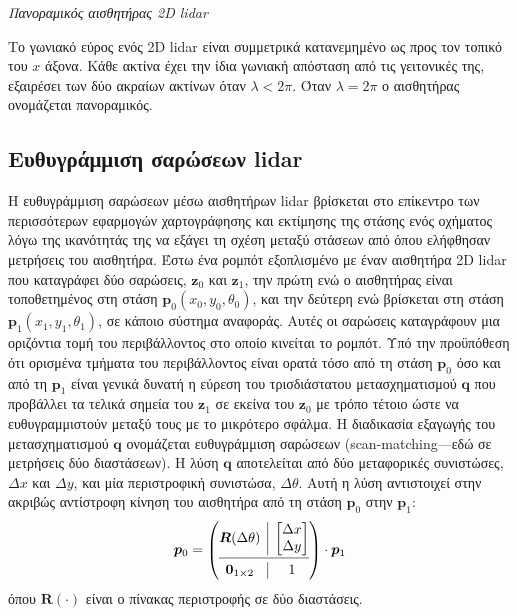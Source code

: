 \begin{bw_box}
\begin{definition}
  \label{def:panoramic_lidar_sensor}
  \textit{Πανοραμικός αισθητήρας 2D lidar}

  Το γωνιακό εύρος ενός 2D lidar είναι συμμετρικά κατανεμημένο ως προς τον
  τοπικό του $x$ άξονα. Κάθε ακτίνα έχει την ίδια γωνιακή απόσταση από τις
  γειτονικές της, εξαιρέσει των δύο ακραίων ακτίνων όταν $\lambda < 2\pi$.
  Όταν $\lambda = 2\pi$ ο αισθητήρας ονομάζεται πανοραμικός.
\end{definition}
\end{bw_box}



\subsection{Ευθυγράμμιση σαρώσεων lidar}
\label{subsec:01_01_02_5}

Η ευθυγράμμιση σαρώσεων μέσω αισθητήρων lidar βρίσκεται στο επίκεντρο των
περισσότερων εφαρμογών χαρτογράφησης και εκτίμησης της στάσης ενός οχήματος
λόγω της ικανότητάς της να εξάγει τη σχέση μεταξύ στάσεων από όπου ελήφθησαν
μετρήσεις του αισθητήρα. Έστω ένα ρομπότ εξοπλισμένο με έναν αισθητήρα 2D lidar
που καταγράφει δύο σαρώσεις, $\bm{z}_0$ και $\bm{z}_1$, την πρώτη ενώ ο
αισθητήρας είναι τοποθετημένος στη στάση $\bm{p}_0(x_0,y_0,\theta_0)$, και την
δεύτερη ενώ βρίσκεται στη στάση $\bm{p}_1(x_1,y_1,\theta_1)$, σε κάποιο σύστημα
αναφοράς. Αυτές οι σαρώσεις καταγράφουν μια οριζόντια τομή του περιβάλλοντος
στο οποίο κινείται το ρομπότ. Υπό την προϋπόθεση ότι ορισμένα τμήματα του
περιβάλλοντος είναι ορατά τόσο από τη στάση $\bm{p}_0$ όσο και από τη
$\bm{p}_1$ είναι γενικά δυνατή η εύρεση του τρισδιάστατου μετασχηματισμού
$\bm{q}$ που προβάλλει τα τελικά σημεία του $\bm{z}_1$ σε εκείνα του $\bm{z}_0$
με τρόπο τέτοιο ώστε να ευθυγραμμιστούν μεταξύ τους με το μικρότερο σφάλμα. Η
διαδικασία εξαγωγής του μετασχηματισμού $\bm{q}$ ονομάζεται ευθυγράμμιση
σαρώσεων (scan-matching---εδώ σε μετρήσεις δύο διαστάσεων). Η λύση $\bm{q}$
αποτελείται από δύο μεταφορικές συνιστώσες, $\Delta x$ και $\Delta y$, και μία
περιστροφική συνιστώσα, $\Delta\theta$. Αυτή η λύση αντιστοιχεί στην ακριβώς
αντίστροφη κίνηση του αισθητήρα από τη στάση $\bm{p}_0$ στην $\bm{p}_1$:
\begin{align}
  \bm{p}_0 =
\left( \begin{array}{@{}c|c@{}}
  \bm{R}(\Delta\theta) &
  \begin{bmatrix}
    \Delta x \\
    \Delta y
  \end{bmatrix}
  \\
   \cmidrule[0.4pt]{1-2}
   \bm{0}_{1 \times 2} & 1 \\
\end{array} \right)
\cdot \bm{p}_1
\end{align}
όπου $\bm{R}(\cdot)$ είναι ο πίνακας περιστροφής σε δύο διαστάσεις.

